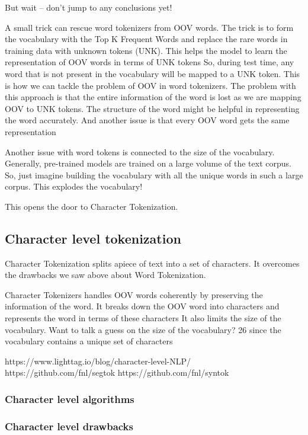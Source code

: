 But wait – don’t jump to any conclusions yet!

    A small trick can rescue word tokenizers from OOV words. The trick is to form the vocabulary with the Top K Frequent Words and replace the rare words in training data with unknown tokens (UNK). This helps the model to learn the representation of OOV words in terms of UNK tokens
    So, during test time, any word that is not present in the vocabulary will be mapped to a UNK token. This is how we can tackle the problem of OOV in word tokenizers.
    The problem with this approach is that the entire information of the word is lost as we are mapping OOV to UNK tokens. The structure of the word might be helpful in representing the word accurately. And another issue is that every OOV word gets the same representation

Another issue with word tokens is connected to the size of the vocabulary. Generally, pre-trained models are trained on a large volume of the text corpus. So, just imagine building the vocabulary with all the unique words in such a large corpus. This explodes the vocabulary!

This opens the door to Character Tokenization.
    
\subsection{Character level tokenization}

Character Tokenization splits apiece of text into a set of characters. It overcomes the drawbacks we saw above about Word Tokenization.

    Character Tokenizers handles OOV words coherently by preserving the information of the word. It breaks down the OOV word into characters and represents the word in terms of these characters
    It also limits the size of the vocabulary. Want to talk a guess on the size of the vocabulary? 26 since the vocabulary contains a unique set of characters

https://www.lighttag.io/blog/character-level-NLP/
https://github.com/fnl/segtok
https://github.com/fnl/syntok

\subsubsection{Character level algorithms}

\subsubsection{Character level drawbacks}

